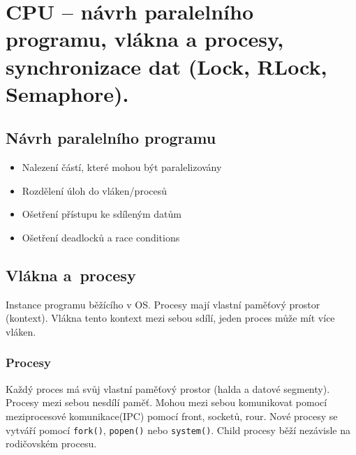 \section{CPU – návrh paralelního programu, vlákna a procesy, synchronizace dat (Lock, RLock, Semaphore).}
\subsection{Návrh paralelního programu}
\begin{itemize}
    \item Nalezení částí, které mohou být paralelizovány
    \item Rozdělení úloh do vláken/procesů
    \item Ošetření přístupu ke sdíleným datům
    \item Ošetření deadlocků a race conditions
\end{itemize}

\subsection{Vlákna a~procesy}
Instance programu běžícího v OS. Procesy mají vlastní paměťový prostor (kontext). Vlákna tento kontext mezi sebou sdílí, jeden proces může mít více vláken.

\subsubsection{Procesy}
Každý proces má svůj vlastní paměťový prostor (halda a datové segmenty). Procesy mezi sebou nesdílí paměť. Mohou mezi sebou komunikovat pomocí meziprocesové komunikace(IPC) pomocí front, socketů, rour.  Nové procesy se vytváří pomocí \texttt{fork()}, \texttt{popen()} nebo \texttt{system()}. Child procesy běží nezávisle na rodičovském procesu.

